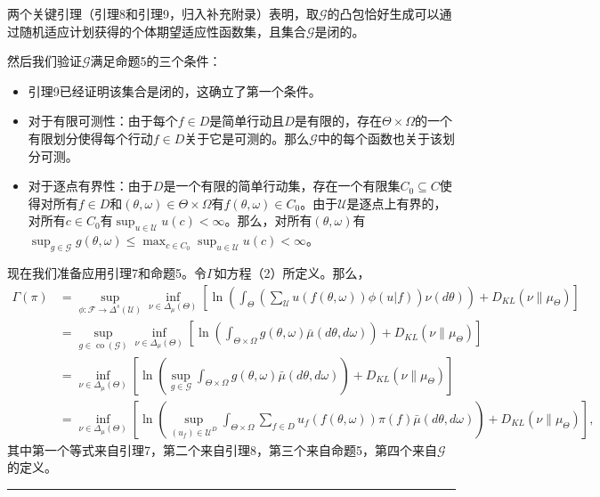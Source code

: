 \documentclass[12pt,a4paper]{article}
\newenvironment{translation}
  {\par\noindent\color{blue!70!black}\smallskip}
  {\par\medskip\hrule\medskip}
\begin{document}
\begin{translation}
两个关键引理（引理8和引理9，归入补充附录）表明，取$\mathcal{G}$的凸包恰好生成可以通过随机适应计划获得的个体期望适应性函数集，且集合$\mathcal{G}$是闭的。

然后我们验证$\mathcal{G}$满足命题5的三个条件：
\begin{itemize}
\item 引理9已经证明该集合是闭的，这确立了第一个条件。
\item 对于有限可测性：由于每个$f \in D$是简单行动且$D$是有限的，存在$\Theta \times \Omega$的一个有限划分使得每个行动$f \in D$关于它是可测的。那么$\mathcal{G}$中的每个函数也关于该划分可测。
\item 对于逐点有界性：由于$D$是一个有限的简单行动集，存在一个有限集$C_0 \subseteq C$使得对所有$f \in D$和$(\theta, \omega) \in \Theta \times \Omega$有$f(\theta, \omega) \in C_0$。由于$\mathcal{U}$是逐点上有界的，对所有$c \in C_0$有$\sup_{u \in \mathcal{U}} u(c) < \infty$。那么，对所有$(\theta, \omega)$有$\sup_{g \in \mathcal{G}} g(\theta, \omega) \leq \max_{c \in C_0} \sup_{u \in \mathcal{U}} u(c) < \infty$。
\end{itemize}

现在我们准备应用引理7和命题5。令$\Gamma$如方程（2）所定义。那么，
\begin{align*}
\Gamma(\pi) &= \sup_{\phi: \mathcal{F} \to \Delta^s(\mathcal{U})} \inf_{\nu \in \Delta_\mu(\Theta)} \left[ \ln\left( \int_\Theta \left( \sum_{\mathcal{U}} u(f(\theta, \omega)) \phi(u|f) \right) \nu(d\theta) \right) + D_{KL}(\nu\|\mu_\Theta) \right] \\
&= \sup_{g \in \operatorname{co}(\mathcal{G})} \inf_{\nu \in \Delta_\mu(\Theta)} \left[ \ln\left( \int_{\Theta \times \Omega} g(\theta, \omega) \bar{\mu}(d\theta, d\omega) \right) + D_{KL}(\nu\|\mu_\Theta) \right] \\
&= \inf_{\nu \in \Delta_\mu(\Theta)} \left[ \ln\left( \sup_{g \in \mathcal{G}} \int_{\Theta \times \Omega} g(\theta, \omega) \bar{\mu}(d\theta, d\omega) \right) + D_{KL}(\nu\|\mu_\Theta) \right] \\
&= \inf_{\nu \in \Delta_\mu(\Theta)} \left[ \ln\left( \sup_{(u_f) \in \mathcal{U}^D} \int_{\Theta \times \Omega} \sum_{f \in D} u_f(f(\theta, \omega)) \pi(f) \bar{\mu}(d\theta, d\omega) \right) + D_{KL}(\nu\|\mu_\Theta) \right],
\end{align*}
其中第一个等式来自引理7，第二个来自引理8，第三个来自命题5，第四个来自$\mathcal{G}$的定义。


\end{translation}
\end{document}
